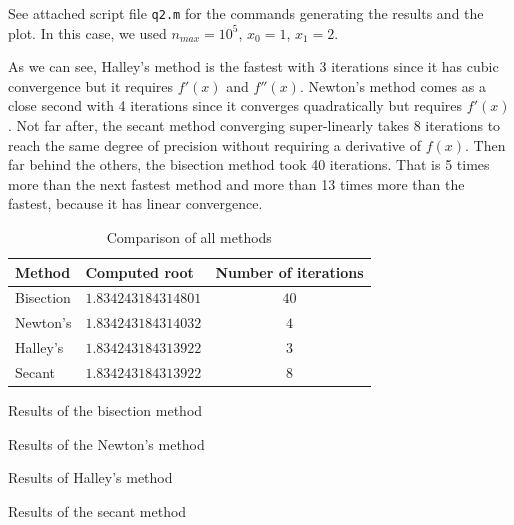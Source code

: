 \documentclass{article}
\begin{document}
\begin{enumerate}
See attached script file \texttt{q2.m} for the commands generating the results and the plot. In this case, we used $n_{max}=10^5$, $x_0=1$, $x_1=2$.

As we can see, Halley's method is the fastest with 3 iterations since it has cubic convergence but it requires $f'(x)$ and $f''(x)$. Newton's method comes as a close second with 4 iterations since it converges quadratically but requires $f'(x)$. Not far after, the secant method converging super-linearly takes 8 iterations to reach the same degree of precision without requiring a derivative of $f(x)$. Then far behind the others, the bisection method took 40 iterations. That is 5 times more than the next fastest method and more than 13 times more than the fastest, because it has linear convergence.

\begin{table}[h]
  \centering
  \begin{tabular}{| l | l | c |}
  \hline
  Method & Computed root & Number of iterations\\ \hline
  Bisection & $1.834243184314801$ & $40$ \\ \hline
  Newton's & $1.834243184314032$ & $4$ \\ \hline
  Halley's & $1.834243184313922$ & $3$ \\ \hline
  Secant & $1.834243184313922$ & $8$ \\ \hline
  \end{tabular}
  \caption{Comparison of all methods}
  \label{table:roots}
\end{table}

\begin{table}[h]
  \centering
  
  \caption{Results of the bisection method}
  \label{table:bisection}
\end{table}

\begin{table}[h]
  \centering
  
  \caption{Results of the Newton's method}
  \label{table:newton}
\end{table}

\begin{table}[h]
  \centering
  
  \caption{Results of Halley's method}
  \label{table:halley}
\end{table}

\begin{table}[h]
  \centering
  
  \caption{Results of the secant method}
  \label{table:secant}
\end{table}


\end{enumerate}
\end{document}
